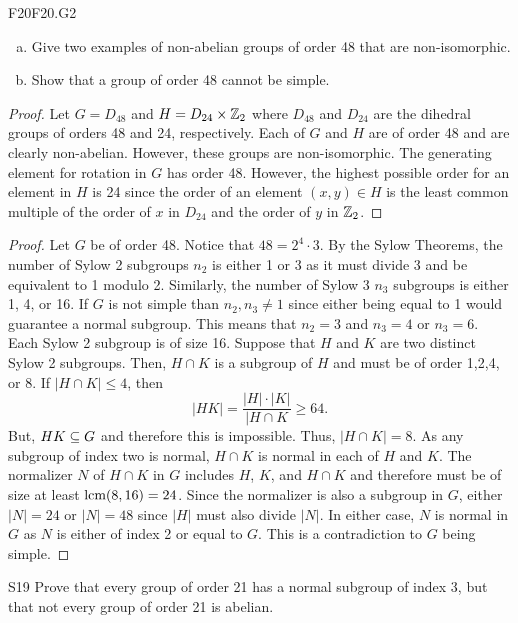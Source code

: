 \documentclass[../../AlgebraQualSolutions.tex]{subfiles}
\begin{document}
	
	\begin{prob}{F20}{F20.G2}
	\begin{enumerate}[(a)]
	\item Give two examples of non-abelian groups of order 48 that are non-isomorphic.
	\item Show that a group of order 48 cannot be simple.
	\end{enumerate}
	\end{prob}
	
	\begin{proof}
	Let $G = D_{48}$ and $H = D_{24} \times \mathbb{Z}_2$ where $D_{48}$ and $D_{24}$ are the dihedral groups of orders 48 and 24, respectively. Each of $G$ and $H$ are of order 48 and are clearly non-abelian. However, these groups are non-isomorphic. The generating element for rotation in $G$ has order 48. However, the highest possible order for an element in $H$ is 24 since the order of an element $(x,y) \in H$ is the least common multiple of the order of $x$ in $D_{24}$ and the order of $y$ in $\mathbb{Z}_2$.
	\end{proof}
	
	\begin{proof}
	Let $G$ be of order 48. Notice that $48 = 2^4 \cdot 3$. By the Sylow Theorems, the number of Sylow 2 subgroups $n_2$ is either 1 or 3 as it must divide 3 and be equivalent to 1 modulo 2. Similarly, the number of Sylow 3 $n_3$ subgroups is either 1, 4, or 16. If $G$ is not simple than $n_2, n_3 \neq 1$ since either being equal to 1 would guarantee a normal subgroup. This means that $n_2 = 3$ and $n_3 = 4$ or $n_3 = 6$. Each Sylow 2 subgroup is of size 16. Suppose that $H$ and $K$ are two distinct Sylow 2 subgroups. Then, $H \cap K$ is a subgroup of $H$ and must be of order 1,2,4, or 8. If $|H \cap K| \leq 4$, then
	\[ |HK| = \frac{|H|\cdot|K|}{|H\cap K} \geq 64. \]
But, $HK \subseteq G$ and therefore this is impossible. Thus, $|H \cap K| = 8$. As any subgroup of index two is normal, $H \cap K$ is normal in each of $H$ and $K$. The normalizer $N$ of $H\cap K$ in $G$ includes $H$, $K$, and $H \cap K$ and therefore must be of size at least $\textrm{lcm}(8,16) = 24$. Since the normalizer is also a subgroup in $G$, either $|N| = 24$ or $|N| = 48$ since $|H|$ must also divide $|N|$. In either case, $N$ is normal in $G$ as $N$ is either of index 2 or equal to $G$. This is a contradiction to $G$ being simple.
	\end{proof}
	
	
	\begin{prob}{S19}{}
	Prove that every group of order 21 has a normal subgroup of index 3, but that not every group of order 21 is abelian.
	\end{prob}
	
\end{document}

